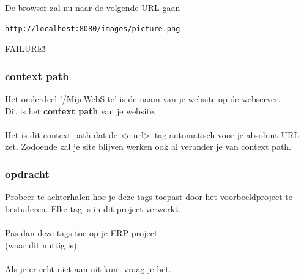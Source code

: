\documentclass{beamer}
\begin{document}
\begin{frame}[fragile]

{\Large De browser zal nu naar de volgende URL gaan

\begin{verbatim}
http://localhost:8080/images/picture.png
\end{verbatim}

FAILURE!}

\end{frame}


\begin{frame}

\frametitle{context path}

{\Large Het onderdeel '/MijnWebSite' is de naam van je website op de webserver.\\
Dit is het \textbf{context path} van je website.\\~\\

Het is dit context path dat de \textless c:url\textgreater\ tag automatisch voor je 
absoluut URL zet. Zodoende zal je site blijven werken ook al verander
je van context path.}

\end{frame}


\begin{frame}

\frametitle{opdracht}

{\Large Probeer te achterhalen hoe je deze tags toepast door het voorbeeldproject te bestuderen. Elke tag is in dit project verwerkt. \\~\\

Pas dan deze tags toe op je ERP project\\ (waar dit nuttig is).\\~\\

Als je er echt niet aan uit kunt vraag je het.}

\end{frame}
\end{document}
